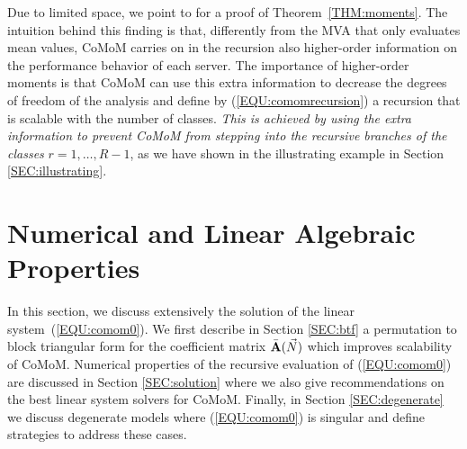 \documentclass[journal,twocolumn,9.5pt]{IEEEtran}
\newcommand{\comom}[1]{\bar{#1}}
\renewcommand{\Pr}{P}
\begin{document}
Due to limited space, we point to \cite{TR} for a proof of Theorem~\ref{THM:moments}. The intuition behind this finding is that, differently from the MVA that only evaluates mean values, CoMoM carries on in the recursion also higher-order information on the performance behavior of each server. The importance of higher-order moments is that CoMoM can use this extra information to decrease the degrees of freedom of the analysis and define by (\ref{EQU:comomrecursion}) a recursion that is scalable with the number of classes. {\em This is achieved by using the extra information to prevent CoMoM from stepping into the recursive branches of the classes} $r=1,\ldots,R-1$, as we have shown in the illustrating example in Section \ref{SEC:illustrating}. %

\section{Numerical and Linear Algebraic Properties}
\label{SEC:linalg}
In this section, we discuss extensively the solution of the linear system~(\ref{EQU:comom0}). We first describe in Section \ref{SEC:btf} a permutation to block triangular form  for the coefficient matrix $\comom{\bf A}(\vec N)$ which improves scalability of CoMoM. Numerical properties of the recursive evaluation of (\ref{EQU:comom0}) are discussed in Section \ref{SEC:solution} where we also give recommendations on the best linear system solvers for CoMoM. Finally, in Section \ref{SEC:degenerate} we discuss degenerate models where (\ref{EQU:comom0}) is singular and define strategies to address these cases.
\end{document}
